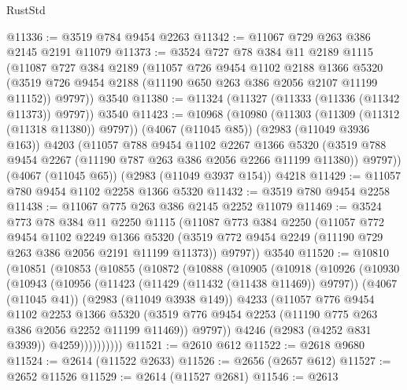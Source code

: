 \begin{lexlean}{RustStd}
\begin{coremodule}
@11336 := @3519 @784 @9454 @2263
@11342 := @11067 @729 @263 @386 @2145 @2191 @11079
@11373 := @3524
    @727
    @78
    @384
    @11
    @2189
    @1115
    (@11087
      @727
      @384
      @2189
      (@11057
        @726
        @9454
        @1102
        @2188
        @1366
        @5320
        (@3519 @726 @9454 @2188 (@11190 @650 @263 @386 @2056 @2107 @11199 @11152))
        @9797))
    @3540
@11380 := @11324 (@11327 (@11333 (@11336 (@11342 @11373)) @9797)) @3540
@11423 := @10968
    (@10980
      (@11303 (@11309 (@11312 (@11318 @11380)) @9797))
      (@4067 (@11045 @85))
      (@2983 (@11049 @3936 @163))
      @4203
      (@11057
        @788
        @9454
        @1102
        @2267
        @1366
        @5320
        (@3519 @788 @9454 @2267 (@11190 @787 @263 @386 @2056 @2266 @11199 @11380))
        @9797))
    (@4067 (@11045 @65))
    (@2983 (@11049 @3937 @154))
    @4218
@11429 := @11057 @780 @9454 @1102 @2258 @1366 @5320
@11432 := @3519 @780 @9454 @2258
@11438 := @11067 @775 @263 @386 @2145 @2252 @11079
@11469 := @3524
    @773
    @78
    @384
    @11
    @2250
    @1115
    (@11087
      @773
      @384
      @2250
      (@11057
        @772
        @9454
        @1102
        @2249
        @1366
        @5320
        (@3519 @772 @9454 @2249 (@11190 @729 @263 @386 @2056 @2191 @11199 @11373))
        @9797))
    @3540
@11520 := @10810
    (@10851
      (@10853
        (@10855
          (@10872
            (@10888
              (@10905
                (@10918
                  (@10926
                    (@10930
                      (@10943
                        (@10956
                          (@11423 (@11429 (@11432 (@11438 @11469)) @9797))
                          (@4067 (@11045 @41))
                          (@2983 (@11049 @3938 @149))
                          @4233
                          (@11057
                            @776
                            @9454
                            @1102
                            @2253
                            @1366
                            @5320
                            (@3519
                              @776
                              @9454
                              @2253
                              (@11190 @775 @263 @386 @2056 @2252 @11199 @11469))
                            @9797))
                        @4246
                        (@2983 (@4252 @831 @3939))
                        @4259))))))))))
@11521 := @2610 @612
@11522 := @2618 @9680
@11524 := @2614 (@11522 @2633)
@11526 := @2656 (@2657 @612)
@11527 := @2652 @11526
@11529 := @2614 (@11527 @2681)
@11546 := @2613

\end{coremodule}
\end{lexlean}

